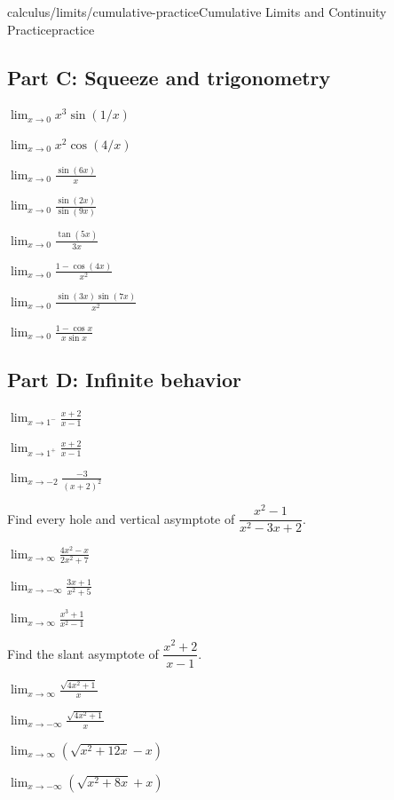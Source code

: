 \begin{webpage}{calculus/limits/cumulative-practice}{Cumulative Limits and Continuity Practice}{practice}
\subsection*{Part C: Squeeze and trigonometry}
\begin{bgexercises}[label=\textbf{R\arabic*.},resume]
  \item \(\displaystyle\lim_{x\to0}x^3\sin(1/x)\)
  \item \(\displaystyle\lim_{x\to0}x^2\cos(4/x)\)
  \item \(\displaystyle\lim_{x\to0}\frac{\sin(6x)}x\)
  \item \(\displaystyle\lim_{x\to0}\frac{\sin(2x)}{\sin(9x)}\)
  \item \(\displaystyle\lim_{x\to0}\frac{\tan(5x)}{3x}\)
  \item \(\displaystyle\lim_{x\to0}\frac{1-\cos(4x)}{x^2}\)
  \item \(\displaystyle\lim_{x\to0}\frac{\sin(3x)\sin(7x)}{x^2}\)
  \item \(\displaystyle\lim_{x\to0}\frac{1-\cos x}{x\sin x}\)
\end{bgexercises}

\subsection*{Part D: Infinite behavior}
\begin{bgexercises}[label=\textbf{R\arabic*.},resume]
  \item \(\displaystyle\lim_{x\to1^-}\frac{x+2}{x-1}\)
  \item \(\displaystyle\lim_{x\to1^+}\frac{x+2}{x-1}\)
  \item \(\displaystyle\lim_{x\to-2}\frac{-3}{(x+2)^2}\)
  \item Find every hole and vertical asymptote of \(\dfrac{x^2-1}{x^2-3x+2}\).
  \item \(\displaystyle\lim_{x\to\infty}\frac{4x^2-x}{2x^2+7}\)
  \item \(\displaystyle\lim_{x\to-\infty}\frac{3x+1}{x^2+5}\)
  \item \(\displaystyle\lim_{x\to\infty}\frac{x^3+1}{x^2-1}\)
  \item Find the slant asymptote of \(\dfrac{x^2+2}{x-1}\).
  \item \(\displaystyle\lim_{x\to\infty}\frac{\sqrt{4x^2+1}}x\)
  \item \(\displaystyle\lim_{x\to-\infty}\frac{\sqrt{4x^2+1}}x\)
  \item \(\displaystyle\lim_{x\to\infty}(\sqrt{x^2+12x}-x)\)
  \item \(\displaystyle\lim_{x\to-\infty}(\sqrt{x^2+8x}+x)\)
\end{bgexercises}


\end{webpage}
